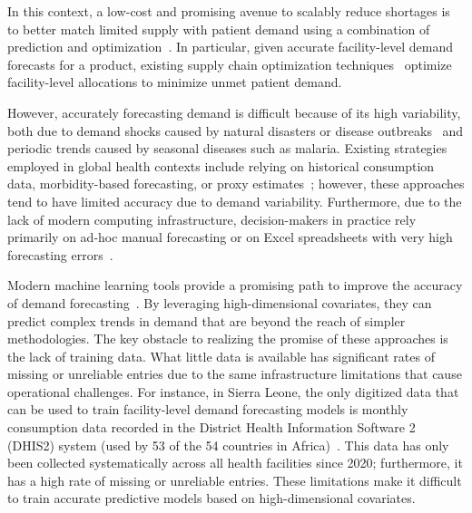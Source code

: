 \documentclass[12pt]{article}
\begin{document}
In this context, a low-cost and promising avenue to scalably reduce shortages is to better match limited supply with patient demand using a combination of prediction and optimization~\cite{zhu2021demand, mbonyinshuti2021prediction, bastani2024optimizing}. In particular, given accurate facility-level demand forecasts for a product, existing supply chain optimization techniques~\cite{bertsimas2006robust,yang2021multilocation,aviv2001effect} optimize facility-level allocations to minimize unmet patient demand.

However, accurately forecasting demand is difficult because of its high variability, both due to demand shocks caused by natural disasters or disease outbreaks~\cite{unicef2015state, yadav2015health, yenet2023challenges} and periodic trends caused by seasonal diseases such as malaria. Existing strategies employed in global health contexts include relying on historical consumption data, morbidity-based forecasting, or proxy estimates~\cite{USAID2014HealthCommodities, Kenya2016FamilyPlanning}; however, these approaches tend to have limited accuracy due to demand variability. Furthermore, due to the lack of modern computing infrastructure, decision-makers in practice rely primarily on ad-hoc manual forecasting or on Excel spreadsheets with very high forecasting errors~\cite{merkuryeva2019demand,fredrick2016factors}.

Modern machine learning tools provide a promising path to improve the accuracy of demand forecasting~\cite{ban2019big}. By leveraging high-dimensional covariates, they can predict complex trends in demand that are beyond the reach of simpler methodologies. The key obstacle to realizing the promise of these approaches is the lack of training data. What little data is available has significant rates of missing or unreliable entries due to the same infrastructure limitations that cause operational challenges. For instance, in Sierra Leone, the only digitized data that can be used to train facility-level demand forecasting models is monthly consumption data recorded in the District Health Information Software 2 (DHIS2) system (used by 53 of the 54 countries in Africa)~\cite{dhis2}. This data has only been collected systematically across all health facilities since 2020; furthermore, it has a high rate of missing or unreliable entries. These limitations make it difficult to train accurate predictive models based on high-dimensional covariates.
\end{document}

